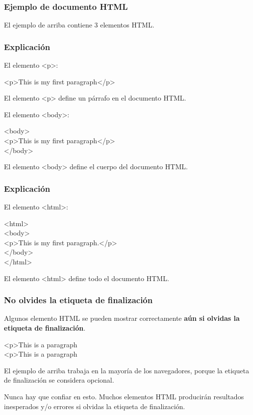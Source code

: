 \documentclass[12pt,a4paper]{beamer}
\begin{document}
\begin{frame}
	\frametitle{Ejemplo de documento HTML}
	
	
	
	El ejemplo de arriba contiene 3 elementos HTML.
\end{frame}

\begin{frame}
	\frametitle{Explicación}
	
	El elemento <p>:
	
	\begin{framed}
		<p>This is my first paragraph</p>
	\end{framed}
	
	El elemento <p> define un párrafo en el documento HTML.
	
	El elemento <body>:
	
	\begin{framed}
		<body>\\
			<p>This is my first paragraph</p>\\
		</body>
	\end{framed}
	
	El elemento <body> define el cuerpo del documento HTML.
\end{frame}

\begin{frame}
	\frametitle{Explicación}
	
	El elemento <html>:
	
	\begin{framed}
		<html>\\
			<body>\\
				<p>This is my first paragraph.</p>\\
			</body>\\
		</html>
	\end{framed}
	
	El elemento <html> define todo el documento HTML.
\end{frame}

\begin{frame}
	\frametitle{No olvides la etiqueta de finalización}
	
	Algunos elemento HTML se pueden mostrar correctamente \textbf{aún si olvidas la etiqueta de finalización}.
	
	\begin{framed}
		<p>This is a paragraph\\
		<p>This is a paragraph
	\end{framed}
	
	El ejemplo de arriba trabaja en la mayoría de los navegadores, porque la etiqueta de finalización se considera opcional.
	
	Nunca hay que confiar en esto. Muchos elementos HTML producirán resultados inesperados y/o errores si olvidas la etiqueta de finalización.
\end{frame}
\end{document}
